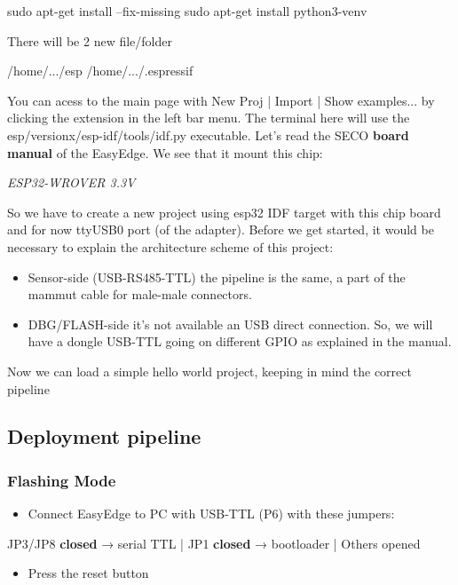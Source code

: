 \begin{center}
    sudo apt-get install --fix-missing
    sudo apt-get install python3-venv
\end{center}
There will be 2 new file/folder

\begin{center}
    /home/.../esp
    /home/.../.espressif
\end{center}
You can acess to the main page with New Proj | Import | Show examples... by clicking the extension in the left bar menu. The terminal here will use the esp/versionx/esp-idf/tools/idf.py executable. Let's read the SECO \textbf{board manual} of the EasyEdge. We see that it mount this chip:

\begin{center}
    \textit{ESP32-WROVER 3.3V}
\end{center}
So we have to create a new project using esp32 IDF target with this chip board and for now ttyUSB0 port (of the adapter). Before we get started, it would be necessary to explain the architecture scheme of this project:

\begin{itemize}
\item Sensor-side (USB-RS485-TTL) the pipeline is the same, a part of the mammut cable for male-male connectors.
\item DBG/FLASH-side it's not available an USB direct connection. So, we will have a dongle USB-TTL going on different GPIO as explained in the manual.
\end{itemize}
Now we can load a simple hello world project, keeping in mind the correct pipeline

\subsection{Deployment pipeline}

\subsubsection{Flashing Mode}

\begin{itemize}
\item Connect EasyEdge to PC with USB-TTL (P6) with these jumpers:
\end{itemize}
\begin{center}
JP3/JP8 \textbf{closed} → serial TTL | JP1 \textbf{closed} → bootloader | Others opened
\end{center}
\begin{itemize}
\item Press the reset button
\end{itemize}

